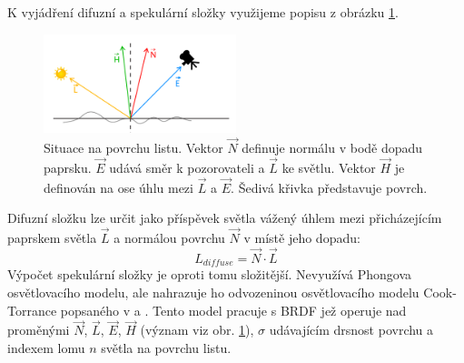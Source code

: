 K vyjádření difuzní a spekulární složky využijeme popisu z obrázku \ref{fig:lightModel}.
 \begin{figure}[here]
\begin{center}
\includegraphics[width=0.5\textwidth]{./figures/lightModel.png}
\end{center}
\caption[Situace na povrchu listu]
{Situace na povrchu listu.  Vektor $\vec{N}$ definuje normálu v bodě dopadu paprsku. $\vec{E}$ udává směr k pozorovateli a $\vec{L}$ ke světlu. Vektor $\vec{H}$ je definován na ose úhlu mezi $\vec{L}$ a $\vec{E}$. Šedivá křivka představuje povrch.\label{fig:lightModel}
}
\end{figure}
Difuzní složku lze určit jako příspěvek světla vážený úhlem mezi přicházejícím paprskem světla $\vec{L}$ a normálou povrchu $\vec{N}$ v místě jeho dopadu:
\begin{equation}
L_{diffuse} = \vec{N} \cdot \vec{L}
\end{equation}
Výpočet spekulární složky je oproti tomu složitější. Nevyužívá Phongova osvětlovacího modelu, ale nahrazuje ho odvozeninou osvětlovacího modelu Cook-Torrance popsaného v \cite{Cook:1981:RMC:965161.806819} a \cite{Bousquet2005201}. Tento model pracuje s BRDF jež operuje nad proměnými $\vec{N}$, $\vec{L}$, $\vec{E}$, $\vec{H}$ (význam viz obr. \ref{fig:lightModel}), $\sigma$ udávajícím drsnost povrchu a indexem lomu $n$ světla na povrchu listu.

